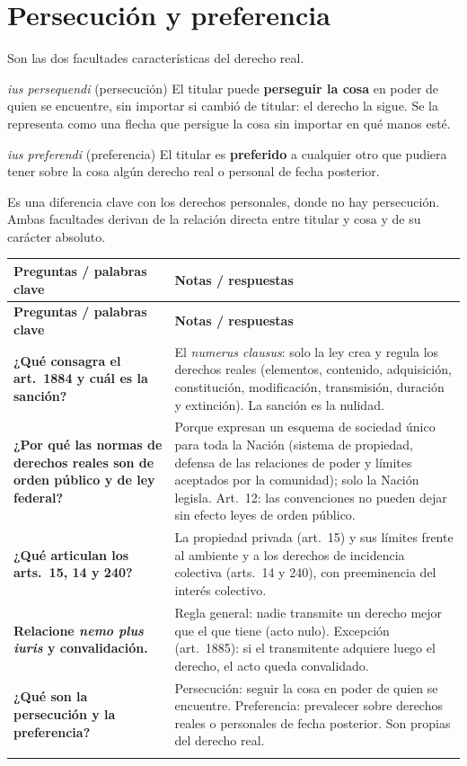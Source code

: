 \documentclass[12pt,oneside]{book}
\makeatletter
\renewcommand{\arraystretch}{1.25}
\newcommand{\cq}[2]{\textbf{#1} & #2 \\[0.45em]}
\newcommand{\cornell}[3]{%
\par\bigskip\noindent{\large\bfseries Cuadro Cornell: #1}\par\nopagebreak\smallskip
\begingroup
\small
\renewcommand{\arraystretch}{1.15}
\begin{longtable}{@{}>{\raggedright\arraybackslash}p{0.26\textwidth}>{\raggedright\arraybackslash}p{0.66\textwidth}@{}}
\toprule
\textbf{Preguntas / palabras clave} & \textbf{Notas / respuestas} \\
\midrule
\endfirsthead
\toprule
\textbf{Preguntas / palabras clave} & \textbf{Notas / respuestas} \\
\midrule
\endhead
#2
\midrule
\multicolumn{2}{@{}p{\dimexpr0.92\textwidth+2\tabcolsep\relax}@{}}{\vspace{0.2em}\textbf{Resumen.} #3\vspace{0.2em}} \\
\bottomrule
\end{longtable}
\endgroup
}
\makeatother
\begin{document}
\section{Persecución y preferencia}

Son las dos facultades características del derecho real.

\begin{definicion}{\textit{ius persequendi} (persecución)}
El titular puede \textbf{perseguir la cosa} en poder de quien se encuentre, sin importar si cambió de titular: el derecho la sigue. Se la representa como una flecha que persigue la cosa sin importar en qué manos esté.
\end{definicion}

\begin{definicion}{\textit{ius preferendi} (preferencia)}
El titular es \textbf{preferido} a cualquier otro que pudiera tener sobre la cosa algún derecho real o personal de fecha posterior.
\end{definicion}

Es una diferencia clave con los derechos personales, donde no hay persecución. Ambas facultades derivan de la relación directa entre titular y cosa y de su carácter absoluto.

\cornell{legalidad y orden público}{
\cq{¿Qué consagra el art.~1884 y cuál es la sanción?}{El \textit{numerus clausus}: solo la ley crea y regula los derechos reales (elementos, contenido, adquisición, constitución, modificación, transmisión, duración y extinción). La sanción es la nulidad.}
\cq{¿Por qué las normas de derechos reales son de orden público y de ley federal?}{Porque expresan un esquema de sociedad único para toda la Nación (sistema de propiedad, defensa de las relaciones de poder y límites aceptados por la comunidad); solo la Nación legisla. Art.~12: las convenciones no pueden dejar sin efecto leyes de orden público.}
\cq{¿Qué articulan los arts.~15, 14 y 240?}{La propiedad privada (art.~15) y sus límites frente al ambiente y a los derechos de incidencia colectiva (arts.~14 y 240), con preeminencia del interés colectivo.}
\cq{Relacione \textit{nemo plus iuris} y convalidación.}{Regla general: nadie transmite un derecho mejor que el que tiene (acto nulo). Excepción (art.~1885): si el transmitente adquiere luego el derecho, el acto queda convalidado.}
\cq{¿Qué son la persecución y la preferencia?}{Persecución: seguir la cosa en poder de quien se encuentre. Preferencia: prevalecer sobre derechos reales o personales de fecha posterior. Son propias del derecho real.}
}{Solo la ley federal crea y regula los derechos reales (\textit{numerus clausus}), bajo normas de orden público y con sanción de nulidad. Ese carácter responde a un esquema de sociedad único y a la preeminencia del interés colectivo. El \textit{nemo plus iuris} limita la transmisión; la convalidación la sana si el transmitente adquiere después el derecho. La persecución y la preferencia son las facultades características del derecho real.}
\end{document}

